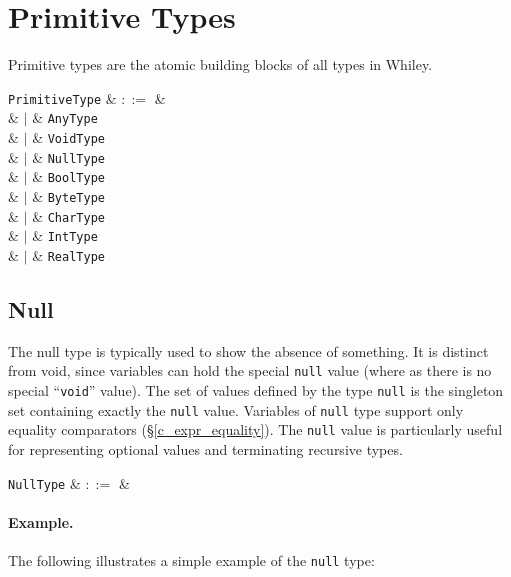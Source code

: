 \section{Primitive Types}
\label{c_types_primitive_types}

Primitive types are the atomic building blocks of all types in Whiley.  

\begin{syntax}
  \verb+PrimitiveType+ & $::=$ & \\
  & $|$ & \verb+AnyType+ \\
  & $|$ & \verb+VoidType+ \\
  & $|$ & \verb+NullType+ \\
  & $|$ & \verb+BoolType+ \\
  & $|$ & \verb+ByteType+ \\
  & $|$ & \verb+CharType+ \\
  & $|$ & \verb+IntType+ \\
  & $|$ & \verb+RealType+ \\
\end{syntax}


\subsection{Null}
\label{c_types_null}

The null type is typically used to show the absence of something. It is distinct from void, since variables can hold the special \lstinline{null} value (where as there is no special ``\lstinline{void}'' value).  The set of values defined by the type \lstinline{null} is the singleton set containing exactly the \lstinline{null} value.  Variables of \lstinline{null} type support only equality comparators (\S\ref{c_expr_equality}).  The \lstinline{null} value is particularly useful for representing optional values and terminating recursive types.

\begin{syntax}
  \verb+NullType+ & $::=$ &  \\
\end{syntax}

\paragraph{Example.} The following illustrates a simple example of the \lstinline{null} type:

